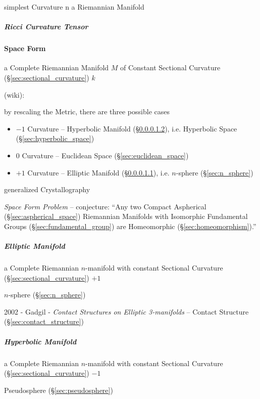 simplest Curvature n a Riemannian Manifold



\subparagraph{Ricci Curvature Tensor}\label{sec:ricci_curvature}\hfill



\paragraph{Space Form}\label{sec:space_form}\hfill

a Complete Riemannian Manifold $M$ of Constant Sectional Curvature
(\S\ref{sec:sectional_curvature}) $k$

(wiki):

by rescaling the Metric, there are three possible cases
\begin{itemize}
  \item $-1$ Curvature -- Hyperbolic Manifold (\S\ref{sec:hyperbolic_manifold}),
    i.e. Hyperbolic Space (\S\ref{sec:hyperbolic_space})
  \item $0$ Curvature -- Euclidean Space (\S\ref{sec:euclidean_space})
  \item $+1$ Curvature -- Elliptic Manifold (\S\ref{sec:elliptic_manifold}),
    i.e. $n$-sphere (\S\ref{sec:n_sphere})
\end{itemize}

generalized Crystallography

\emph{Space Form Problem} -- conjecture: ``Any two Compact Aspherical
(\S\ref{sec:aspherical_space}) Riemannian Manifolds with Isomorphic Fundamental
Groups (\S\ref{sec:fundamental_group}) are Homeomorphic
(\S\ref{sec:homeomorphism}).''



\subparagraph{Elliptic Manifold}\label{sec:elliptic_manifold}\hfill

a Complete Riemannian $n$-manifold with constant Sectional Curvature
(\S\ref{sec:sectional_curvature}) $+1$

$n$-sphere (\S\ref{sec:n_sphere})

2002 - Gadgil - \emph{Contact Structures on Elliptic 3-manifolds}
-- Contact Structure (\S\ref{sec:contact_structure})



\subparagraph{Hyperbolic Manifold}\label{sec:hyperbolic_manifold}\hfill

a Complete Riemannian $n$-manifold with constant Sectional Curvature
(\S\ref{sec:sectional_curvature}) $-1$

Pseudosphere (\S\ref{sec:pseudosphere})



